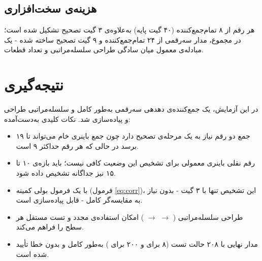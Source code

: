 \documentclass[12pt]{article}
\begin{document}
\subsection{هزینه‌ی سخت‌افزاری}
هر رقم  از ۸ تمام‌جمع‌کننده (۴۰ گیت پایه) به‌علاوه‌ی ۳ گیت تصحیح تشکیل شده است؛ در مجموع، مدار سه‌رقمی  از ۲۴ تمام‌جمع‌کننده و ۹ گیت تصحیح ساخته شده  -  یک مبادله‌ی معمول میان سادگی طراحی سلسله‌مراتبی و تعداد قطعات.

\section{نتیجه‌گیری}

در این آزمایش، یک جمع‌کننده‌ی دهدهی سه‌رقمی به‌طور کامل و سلسله‌مراتبی طراحی و پیاده‌سازی شد. نکات کلیدی به‌دست‌آمده:

\begin{itemize}
  \item جمع دو رقم  نیاز به یک مرحله‌ی تصحیح دارد چون جمع باینری خام می‌تواند تا ۱۹ برسد در حالی که هر رقم  حداکثر ۹ است.
  \item رقم نقلی باینری معمولی برای تشخیص این وضعیت کافی نیست؛ باید بازه‌ی ۱۰ تا ۱۵ نیز جداگانه تشخیص داده شود.
  \item با یک فرمول بولی کمینه (فرمول \eqref{eq:corr})، این تشخیص تنها با ۳ گیت  -  بدون نیاز به مقایسه‌گر کامل  -  قابل پیاده‌سازی است.
  \item طراحی سلسله‌مراتبی ( $\to$  $\to$ ) امکان استفاده‌ی مجدد و تست مستقل هر سطح را فراهم می‌کند.
  \item مدار نهایی با ۲۰۸ حالت تست (۸ برای  و ۲۰۰ برای ) به‌طور کامل و بدون خطا تأیید شده است.
\end{itemize}
\end{document}
